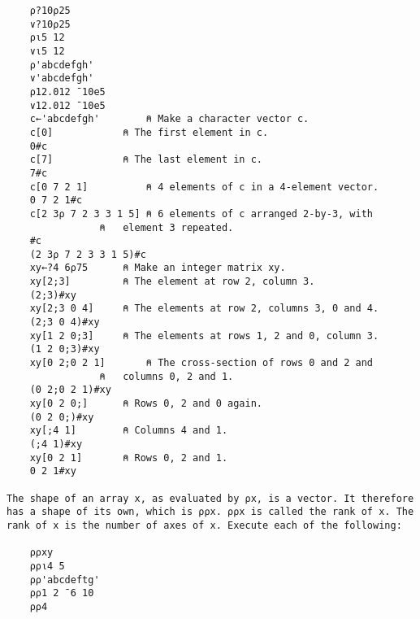 \documentclass{article}
\begin{document}
\begin{verbatim}
	⍴?10⍴25                                                              
	∨?10⍴25                                                              
	⍴⍳5 12                                                               
	∨⍳5 12                                                               
	⍴'abcdefgh'                                                          
	∨'abcdefgh'                                                          
	⍴12.012 ¯10e5                                                        
	∨12.012 ¯10e5                                                        
	c←'abcdefgh'		⍝ Make a character vector c. 
	c[0]			⍝ The first element in c. 
	0#c                                                                  
	c[7]			⍝ The last element in c.   
	7#c                                                                  
	c[0 7 2 1]  		⍝ 4 elements of c in a 4-element vector.    
	0 7 2 1#c                                                            
	c[2 3⍴ 7 2 3 3 1 5]	⍝ 6 elements of c arranged 2-by-3, with 
				⍝   element 3 repeated. 
	#c                                                                   
	(2 3⍴ 7 2 3 3 1 5)#c	                                                
	xy←?4 6⍴75		⍝ Make an integer matrix xy.  
	xy[2;3]			⍝ The element at row 2, column 3.   
	(2;3)#xy                                                             
	xy[2;3 0 4]		⍝ The elements at row 2, columns 3, 0 and 4.  
	(2;3 0 4)#xy                                                         
	xy[1 2 0;3]		⍝ The elements at rows 1, 2 and 0, column 3. 
	(1 2 0;3)#xy                                                         
	xy[0 2;0 2 1]		⍝ The cross-section of rows 0 and 2 and 
				⍝   columns 0, 2 and 1.
	(0 2;0 2 1)#xy                                                       
	xy[0 2 0;]		⍝ Rows 0, 2 and 0 again. 
	(0 2 0;)#xy                                      
	xy[;4 1]		⍝ Columns 4 and 1.  
	(;4 1)#xy                          
	xy[0 2 1]		⍝ Rows 0, 2 and 1.
	0 2 1#xy                                                             

The shape of an array x, as evaluated by ⍴x, is a vector. It therefore
has a shape of its own, which is ⍴⍴x. ⍴⍴x is called the rank of x. The
rank of x is the number of axes of x. Execute each of the following:  

	⍴⍴xy                                                                 
	⍴⍴⍳4 5                                                               
	⍴⍴'abcdeftg'                                                         
	⍴⍴1 2 ¯6 10                                                          
	⍴⍴4                                                                  


\end{verbatim}
\end{document}
